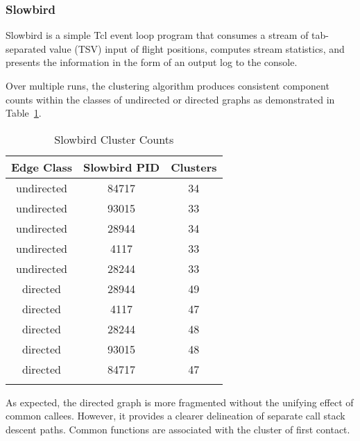 \documentclass{article}[letter,10pt]
\begin{document}
{{    \subsubsection{Slowbird}{
      Slowbird is a simple Tcl event loop program that consumes a stream of tab-separated value (TSV) input of flight
      positions, computes stream statistics, and presents the information in the form of an output log to the console.

      Over multiple runs, the clustering algorithm produces consistent component counts within the classes of undirected
      or directed graphs as demonstrated in Table~\ref{tbl:slowbirdclcts}.
      {\footnotesize
      \begin{longtable}{c c c}
        Edge Class & Slowbird PID & Clusters \\
        \endhead
        \hline
        undirected & 84717  & 34 \\
        undirected & 93015  & 33 \\
        undirected & 28944  & 34 \\
        undirected & 4117  & 33 \\
        undirected & 28244  & 33 \\
        \hline
        directed & 28944  & 49 \\
        directed & 4117  & 47 \\
        directed & 28244  & 48 \\
        directed & 93015  & 48 \\
        directed & 84717  & 47 \\
        \hline
        \caption{Slowbird Cluster Counts}
        \label{tbl:slowbirdclcts}
      \end{longtable}}
      As expected, the directed graph is more fragmented without the unifying effect of common callees. However, it provides
      a clearer delineation of separate call stack descent paths. Common functions are associated with the cluster of first contact.

}}}
\end{document}
